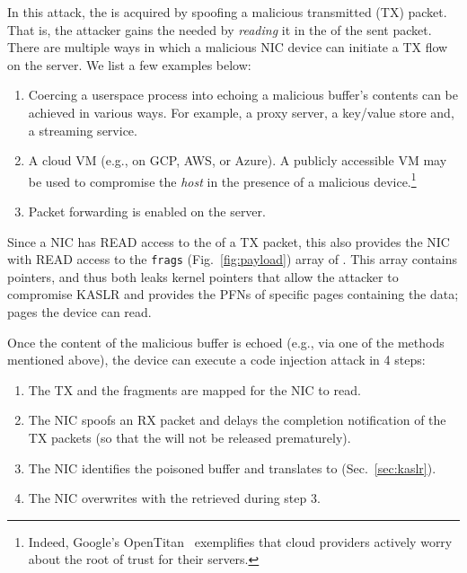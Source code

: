 In this attack, the \kva is acquired by spoofing a malicious transmitted (TX) packet. That is, the attacker gains the needed \kva by \emph{reading} it in the \shinfo of the sent packet. 
%
There are multiple ways in which a malicious NIC device can initiate a TX flow on the server. We list a few examples below:
\begin{enumerate}
    \item Coercing a userspace process into echoing a malicious buffer's contents can be achieved in various ways. For example, a proxy server, a key/value store and, a streaming service.
    \item A cloud VM (e.g., on GCP, AWS, or Azure). A publicly accessible VM may be used to compromise the \emph{host} in the presence of a malicious device.\footnote{Indeed, Google's OpenTitan~\cite{opentitan} exemplifies that cloud providers actively worry about the root of trust for their servers.}
    \item Packet forwarding is enabled on the server.
\end{enumerate}
Since a NIC has READ access to the \shinfo{} of a TX packet, this also provides the NIC with READ access to the \texttt{frags} (Fig.~\ref{fig:payload}) array of \shinfo{}. This array contains \page{} pointers, and thus both leaks kernel pointers that allow the attacker to compromise KASLR and provides the PFNs of specific pages containing the data; pages the device can read.


Once the content of the malicious buffer is echoed (e.g., via one of the methods mentioned above), the device can execute a code injection attack in 4 steps:  
%
\begin{enumerate}[labelindent=3pt]
    \item The TX \data{} and the fragments are mapped for the NIC to read.
    \item The NIC spoofs an RX packet and delays the completion notification of the TX packets (so that the \mabaf{} will not be released prematurely).
    \item The NIC identifies the poisoned buffer and translates \page{} to \kva{} (Sec.~\ref{sec:kaslr}).
    \item The NIC overwrites \shinfo{} with the \kva{} retrieved during step 3. 
\end{enumerate}

